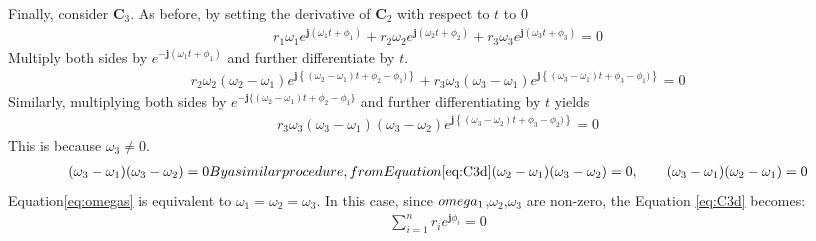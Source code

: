 \documentclass[tombow,dvipdfmx]{corona-a5-1.1}
\begin{document}
\begin{証明}
Finally, consider $\bm{C}_3$.
As before, by setting the derivative of $\bm{C}_2$ with respect to $t$ to 0
\begin{align}\label{eq:C3d}
r_1 \omega_1 e^{ \bm{j} (\omega_1 t + \phi_1)}
+ r_2 \omega_2 e^{ \bm{j} (\omega_2 t + \phi_2)}
+ r_3 \omega_3 e^{ \bm{j} (\omega_3 t + \phi_3)}=0
\end{align}
Multiply both sides by $e^{ -\bm{j} (\omega_1 t + \phi_1)}$ and further differentiate by $t$.
\begin{align*}
r_2 \omega_2 (\omega_2-\omega_1)
e^{ \bm{j} \left\{ 
(\omega_2-\omega_1) t + \phi_2 - \phi_1)
\right\}
} +
r_3 \omega_3 (\omega_3-\omega_1)
e^{ \bm{j} \left\{ 
(\omega_3-\omega_1) t + \phi_3 - \phi_1)
\right\}
}=0
\end{align*}
Similarly, multiplying both sides by $e^{ -\bm{j} \{(\omega_2-\omega_1) t + \phi_2 - \phi_1\}}$ and further differentiating by $t$ yields
\begin{align*}
r_3 \omega_3 (\omega_3-\omega_1) (\omega_3-\omega_2)
e^{ \bm{j} \left\{ 
(\omega_3-\omega_2) t + \phi_3 - \phi_2)
\right\}
}=0
\end{align*}
This is because $\omega_3\neq0$.
\begin{subequations}\label{eq:omegas}
\begin{align}
(\omega_3-\omega_1) (\omega_3-\omega_2)=0
\end{align}
By a similar procedure, from Equation \ref{eq:C3d}
\begin{align}
(\omega_2-\omega_1) (\omega_3-\omega_2)=0
,\qquad
(\omega_3-\omega_1) (\omega_2-\omega_1)=0
\end{align}
\end{subequations}
Equation\ref{eq:omegas} is equivalent to $\omega_1=\omega_2=\omega_3$.
In this case, since $\\omega_1$,$\omega_2$,$\omega_3$ are non-zero, the Equation \ref{eq:C3d} becomes:
\begin{align*}
\sum_{i=1}^n r_i e^{\bm{j}\phi_i}
=0
\end{align*}
\end{証明}
\end{document}
